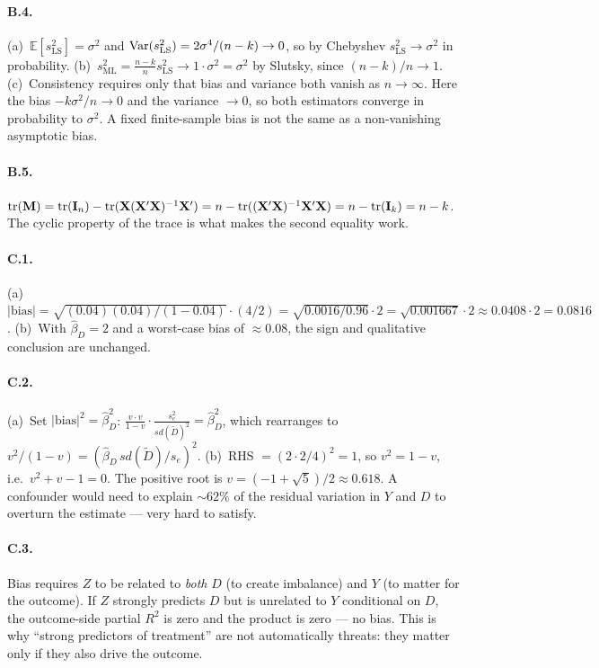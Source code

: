\documentclass{article}
\newcommand{\E}{\mathbb{E}}
\begin{document}
\paragraph{B.4.}  (a)~$\E[s_{\text{LS}}^2] = \sigma^2$ and $\mbox{Var}(s_{\text{LS}}^2) = 2\sigma^4/(n-k) \to 0$, so by Chebyshev $s_{\text{LS}}^2 \to \sigma^2$ in probability.  (b)~$s_{\text{ML}}^2 = \frac{n-k}{n} s_{\text{LS}}^2 \to 1 \cdot \sigma^2 = \sigma^2$ by Slutsky, since $(n-k)/n \to 1$.  (c)~Consistency requires only that bias and variance both vanish as $n\to\infty$.  Here the bias $-k\sigma^2/n \to 0$ and the variance $\to 0$, so both estimators converge in probability to $\sigma^2$.  A fixed finite-sample bias is not the same as a non-vanishing asymptotic bias.

\paragraph{B.5.}  $\text{tr}({\mathbf M}) = \text{tr}({\mathbf I}_n) - \text{tr}({\mathbf X}({\mathbf X}'{\mathbf X})^{-1}{\mathbf X}') = n - \text{tr}(({\mathbf X}'{\mathbf X})^{-1}{\mathbf X}'{\mathbf X}) = n - \text{tr}({\mathbf I}_k) = n - k$.  The cyclic property of the trace is what makes the second equality work.

\bigskip

\paragraph{C.1.}  (a)~$|\text{bias}| = \sqrt{(0.04)(0.04)/(1 - 0.04)} \cdot (4/2) = \sqrt{0.0016/0.96}\cdot 2 = \sqrt{0.001667}\cdot 2 \approx 0.0408 \cdot 2 = 0.0816$.  (b)~With $\hat\beta_D = 2$ and a worst-case bias of $\approx 0.08$, the sign and qualitative conclusion are unchanged.

\paragraph{C.2.}  (a)~Set $|\text{bias}|^2 = \hat\beta_D^2$: $\frac{v\cdot v}{1-v}\cdot\frac{s_e^2}{sd(\tilde D)^2} = \hat\beta_D^2$, which rearranges to $v^2/(1-v) = (\hat\beta_D\,sd(\tilde D)/s_e)^2$.  (b)~RHS $= (2\cdot 2/4)^2 = 1$, so $v^2 = 1 - v$, i.e.\ $v^2 + v - 1 = 0$.  The positive root is $v = (-1 + \sqrt{5})/2 \approx 0.618$.  A confounder would need to explain $\sim 62\%$ of the residual variation in $Y$ and $D$ to overturn the estimate --- very hard to satisfy.

\paragraph{C.3.}  Bias requires $Z$ to be related to \emph{both} $D$ (to create imbalance) and $Y$ (to matter for the outcome).  If $Z$ strongly predicts $D$ but is unrelated to $Y$ conditional on $D$, the outcome-side partial $R^2$ is zero and the product is zero --- no bias.  This is why ``strong predictors of treatment'' are not automatically threats: they matter only if they also drive the outcome.
\end{document}
